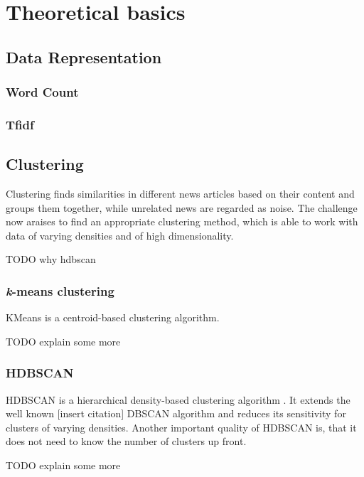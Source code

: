 \section{Theoretical basics}

\subsection{Data Representation}

\subsubsection{Word Count}

\subsubsection{Tfidf}

\subsection{Clustering}
Clustering finds similarities in different news articles based on their content and groups them together, while unrelated news are regarded as noise. The challenge now araises to find an appropriate clustering method, which is able to work with data of varying densities and of high dimensionality.

TODO why hdbscan

\subsubsection{\textit{k}-means clustering}
KMeans is a centroid-based clustering algorithm.

TODO explain some more

\subsubsection{HDBSCAN}
HDBSCAN is a hierarchical density-based clustering algorithm \cite{McInnes2017}. It extends the well known [insert citation] DBSCAN algorithm and reduces its sensitivity for clusters of varying densities. Another important quality of HDBSCAN is, that it does not need to know the number of clusters up front.

TODO explain some more
